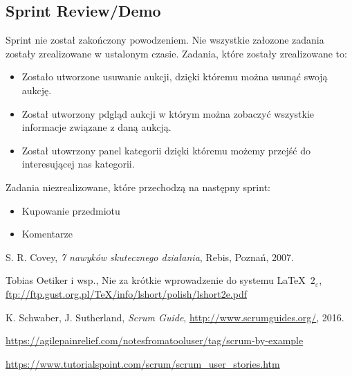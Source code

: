 \documentclass[a4paper]{article}
\begin{document}
	\subsection{Sprint Review/Demo}
	Sprint nie został zakończony powodzeniem. Nie wszystkie załozone zadania zostały zrealizowane w ustalonym czasie. Zadania, które zostały zrealizowane to:
	
\begin{itemize}

\item Zostało utworzone usuwanie aukcji, dzięki któremu można usunąć swoją aukcję.
\item Został utworzony pdgląd aukcji w którym można zobaczyć wszystkie informacje związane z daną aukcją.
\item Został utowrzony panel kategorii dzięki któremu możemy przejść do interesującej nas kategorii.

\end{itemize}
	
Zadania niezrealizowane, które przechodzą na następny sprint:

\begin{itemize}

\item Kupowanie przedmiotu
\item Komentarze

\end{itemize}
	
	\begin{thebibliography}{9}
		
		 S. R. Covey, {\em 7 nawyków skutecznego działania}, Rebis, Poznań, 2007.
		
		 Tobias Oetiker i wsp., Nie za krótkie wprowadzenie do systemu \LaTeX  \ $2_\varepsilon$, \url{ftp://ftp.gust.org.pl/TeX/info/lshort/polish/lshort2e.pdf}
		
		 K. Schwaber, J. Sutherland, {\em Scrum Guide}, \url{http://www.scrumguides.org/}, 2016.
		
		 \url{https://agilepainrelief.com/notesfromatooluser/tag/scrum-by-example}
		
		 \url{https://www.tutorialspoint.com/scrum/scrum_user_stories.htm}
		
	\end{thebibliography}
	
\end{document}
